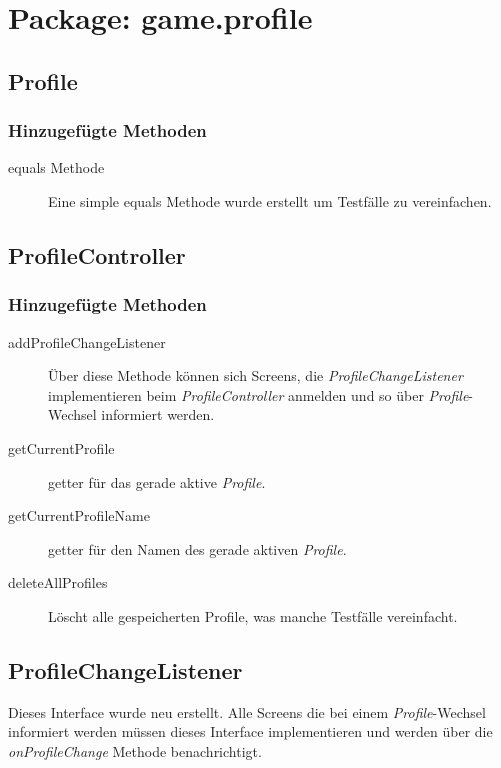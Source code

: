 \section{Package: game.profile}

\subsection{Profile}

\subsubsection{Hinzugefügte Methoden}
\begin{description}
\item[equals Methode]
Eine simple equals Methode wurde erstellt um Testfälle zu vereinfachen.
\end{description}


\subsection{ProfileController}

\subsubsection{Hinzugefügte Methoden}
\begin{description}
\item[addProfileChangeListener]
Über diese Methode können sich Screens, die \emph{ProfileChangeListener} implementieren beim \emph{ProfileController} anmelden und so über \emph{Profile}-Wechsel informiert werden.
\item[getCurrentProfile]
getter für das gerade aktive \emph{Profile}.
\item[getCurrentProfileName]
getter für den Namen des gerade aktiven \emph{Profile}.
\item[deleteAllProfiles]
Löscht alle gespeicherten Profile, was manche Testfälle vereinfacht.
\end{description}

\subsection{ProfileChangeListener}
Dieses Interface wurde neu erstellt. Alle Screens die bei einem  \emph{Profile}-Wechsel informiert werden müssen dieses Interface implementieren und werden über die \emph{onProfileChange} Methode benachrichtigt.




